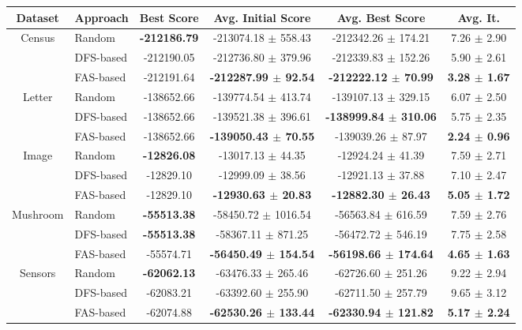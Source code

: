 \centering
\begin{tabular}{| c | l | c | c | c | c | }
	\hline
	Dataset & Approach & Best Score & Avg. Initial Score & Avg. Best Score & Avg. It. \\ \hline
	\multirow{3}{*}{Census} & Random & \textbf{-212186.79} & -213074.18 $\pm$ 558.43 & -212342.26 $\pm$ 174.21 & 7.26 $\pm$ 2.90 \\ \cline{2-6} 
			& DFS-based & -212190.05 & -212736.80 $\pm$ 379.96 & -212339.83 $\pm$ 152.26 & 5.90 $\pm$ 2.61 \\ \cline{2-6}
			& FAS-based & -212191.64 & \textbf{-212287.99 $\pm$ 92.54} & \textbf{-212222.12 $\pm$ 70.99} & \textbf{3.28 $\pm$ 1.67} \\ \hline \hline

	\multirow{3}{*}{Letter} & Random & -138652.66 & -139774.54 $\pm$ 413.74 & -139107.13 $\pm$ 329.15 & 6.07 $\pm$ 2.50 \\ \cline{2-6} 
			& DFS-based & -138652.66 & -139521.38 $\pm$ 396.61 & \textbf{-138999.84 $\pm$ 310.06} & 5.75 $\pm$ 2.35 \\ \cline{2-6}
			& FAS-based & -138652.66 & \textbf{-139050.43 $\pm$ 70.55} & -139039.26 $\pm$ 87.97 & \textbf{2.24 $\pm$ 0.96} \\ \hline \hline

	\multirow{3}{*}{Image} & Random & \textbf{-12826.08} & -13017.13 $\pm$ 44.35 & -12924.24 $\pm$ 41.39 & 7.59 $\pm$ 2.71 \\ \cline{2-6} 
			& DFS-based & -12829.10 & -12999.09 $\pm$ 38.56 & -12921.13 $\pm$ 37.88 & 7.10 $\pm$ 2.47 \\ \cline{2-6}
			& FAS-based & -12829.10 & \textbf{-12930.63 $\pm$ 20.83} & \textbf{-12882.30 $\pm$ 26.43} & \textbf{5.05 $\pm$ 1.72} \\ \hline \hline

	\multirow{3}{*}{Mushroom} & Random & \textbf{-55513.38} & -58450.72 $\pm$ 1016.54 & -56563.84 $\pm$ 616.59 & 7.59 $\pm$ 2.76 \\ \cline{2-6} 
			& DFS-based & \textbf{-55513.38} & -58367.11 $\pm$ 871.25 & -56472.72 $\pm$ 546.19 & 7.75 $\pm$ 2.58 \\ \cline{2-6}
			& FAS-based & -55574.71 & \textbf{-56450.49 $\pm$ 154.54} & \textbf{-56198.66 $\pm$ 174.64} & \textbf{4.65 $\pm$ 1.63} \\ \hline \hline

	\multirow{3}{*}{Sensors} & Random & \textbf{-62062.13} & -63476.33 $\pm$ 265.46 & -62726.60 $\pm$ 251.26 & 9.22 $\pm$ 2.94 \\ \cline{2-6} 
			& DFS-based & -62083.21 & -63392.60 $\pm$ 255.90 & -62711.50 $\pm$ 257.79 & 9.65 $\pm$ 3.12 \\ \cline{2-6}
			& FAS-based & -62074.88 & \textbf{-62530.26 $\pm$ 133.44} & \textbf{-62330.94 $\pm$ 121.82} & \textbf{5.17 $\pm$ 2.24} \\ \hline
\end{tabular}